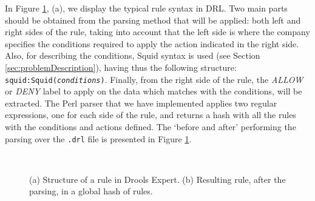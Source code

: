 \documentclass{llncs}
\begin{document}
In Figure \ref{fig:drools_hash}, (a), we display the typical rule syntax in DRL. Two main parts should be obtained from the parsing method that will be applied: both left and right sides of the rule, taking into account that the left side is where the company specifies the conditions required to apply the action indicated in the right side. Also, for describing the conditions, Squid syntax is used (see Section \ref{sec:problemDescription}), having thus the following structure: \texttt{squid:Squid(\textit{conditions})}. Finally, from the right side of the rule, the \textit{ALLOW} or \textit{DENY} label to apply on the data which matches with the conditions, will be extracted. 
The Perl parser that we have implemented applies two regular expressions, one for each side of the rule, and returns a hash with all the rules with the conditions and actions defined. The `before and after' performing the parsing over the \texttt{.drl} file is presented in Figure \ref{fig:drools_hash}.

\begin{figure}[htb]
\centering
{}
~
\caption{(a) Structure of a rule in Drools Expert. (b) Resulting rule, after the parsing, in a global hash of rules. \label{fig:drools_hash}}
\end{figure}
\end{document}
